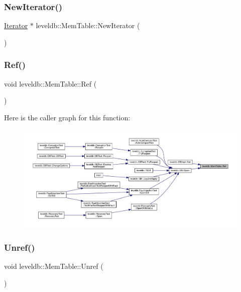 \subsubsection{\texorpdfstring{NewIterator()}{NewIterator()}}
{\footnotesize\ttfamily \mbox{\hyperlink{classleveldb_1_1_iterator}{Iterator}} $\ast$ leveldb\+::\+Mem\+Table\+::\+New\+Iterator (\begin{DoxyParamCaption}{ }\end{DoxyParamCaption})}

\mbox{\label{classleveldb_1_1_mem_table_a332484cffd2ebc7d6a51f22eeeeeb71b}} 
\subsubsection{\texorpdfstring{Ref()}{Ref()}}
{\footnotesize\ttfamily void leveldb\+::\+Mem\+Table\+::\+Ref (\begin{DoxyParamCaption}{ }\end{DoxyParamCaption})\hspace{0.3cm}{\ttfamily [inline]}}

Here is the caller graph for this function\+:
\nopagebreak
\begin{figure}[H]
\begin{center}
\leavevmode
\includegraphics[width=350pt]{classleveldb_1_1_mem_table_a332484cffd2ebc7d6a51f22eeeeeb71b_icgraph}
\end{center}
\end{figure}
\mbox{\label{classleveldb_1_1_mem_table_a5dcbf17d1477e6098a30dadd0745cfb2}} 
\subsubsection{\texorpdfstring{Unref()}{Unref()}}
{\footnotesize\ttfamily void leveldb\+::\+Mem\+Table\+::\+Unref (\begin{DoxyParamCaption}{ }\end{DoxyParamCaption})\hspace{0.3cm}{\ttfamily [inline]}}

